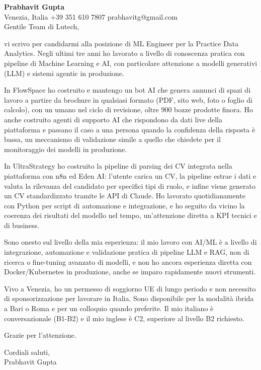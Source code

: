 \documentclass[a4paper,10.5pt]{article}
\begin{document}
\textbf{Prabhavit Gupta}\\
Venezia, Italia \textbar{} +39 351 610 7807 \textbar{} prabhavitg@gmail.com\\[10pt]
Gentile Team di Lutech,

vi scrivo per candidarmi alla posizione di ML Engineer per la Practice Data Analytics. Negli ultimi tre anni ho lavorato a livello di conoscenza pratica con pipeline di Machine Learning e AI, con particolare attenzione a modelli generativi (LLM) e sistemi agentic in produzione.

In FlowSpace ho costruito e mantengo un bot AI che genera annunci di spazi di lavoro a partire da brochure in qualsiasi formato (PDF, sito web, foto o foglio di calcolo), con un umano nel ciclo di revisione, oltre 900 bozze prodotte finora. Ho anche costruito agenti di supporto AI che rispondono da dati live della piattaforma e passano il caso a una persona quando la confidenza della risposta è bassa, un meccanismo di validazione simile a quello che chiedete per il monitoraggio dei modelli in produzione.

In UltraStrategy ho costruito la pipeline di parsing dei CV integrata nella piattaforma con n8n ed Eden AI: l'utente carica un CV, la pipeline estrae i dati e valuta la rilevanza del candidato per specifici tipi di ruolo, e infine viene generato un CV standardizzato tramite le API di Claude. Ho lavorato quotidianamente con Python per script di automazione e integrazione, e ho seguito da vicino la coerenza dei risultati del modello nel tempo, un'attenzione diretta a KPI tecnici e di business.

Sono onesto sul livello della mia esperienza: il mio lavoro con AI/ML è a livello di integrazione, automazione e validazione pratica di pipeline LLM e RAG, non di ricerca o fine-tuning avanzato di modelli, e non ho ancora esperienza diretta con Docker/Kubernetes in produzione, anche se imparo rapidamente nuovi strumenti.

Vivo a Venezia, ho un permesso di soggiorno UE di lungo periodo e non necessito di sponsorizzazione per lavorare in Italia. Sono disponibile per la modalità ibrida a Bari o Roma e per un colloquio quando preferite. Il mio italiano è conversazionale (B1-B2) e il mio inglese è C2, superiore al livello B2 richiesto.

Grazie per l'attenzione.

Cordiali saluti,\\
Prabhavit Gupta
\end{document}
